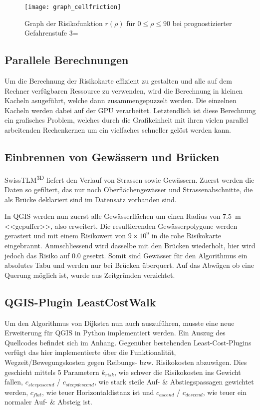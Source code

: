 \begin{figure}[H]
  \centering
  \texttt{[image: graph\_cellfriction]}
  \caption{Graph der Risikofunktion $r(\rho)$ für $0 \leq \rho \leq 90$ bei prognostizierter Gefahrenstufe 3=}\label{fig:graph}
\end{figure}

\subsection{Parallele Berechnungen}

Um die Berechnung der Risikokarte effizient zu gestalten und alle auf dem Rechner verfügbaren Ressource zu verwenden, wird die Berechnung in kleinen Kacheln asugeführt, welche dann zusammengepuzzelt werden. Die einzelnen Kacheln werden dabei auf der GPU verarbeitet. Letztendlich ist diese Berechnung ein grafisches Problem, welches durch die Grafikeinheit mit ihren vielen parallel arbeitenden Rechenkernen um ein vielfaches schneller gelöst werden kann.

\subsection{Einbrennen von Gewässern und Brücken}

SwissTLM\textsuperscript{3D} liefert den Verlauf von Strassen sowie Gewässern. Zuerst werden die Daten so gefiltert, das nur noch Oberflächengewässer und Strassenabschnitte, die als Brücke deklariert sind im Datensatz vorhanden sind.

In QGIS werden nun zuerst alle Gewässerflächen um einen Radius von \qty{7.5}{m} <<gepuffer>>, also erweitert. Die resultierenden Gewässerpolygone werden gerastert und mit einem Risikowert von $9 \times 10^{9}$ in die rohe Risikokarte eingebrannt. Anmschliessend wird dasselbe mit den Brücken wiederholt, hier wird jedoch das Risiko auf $0.0$ gesetzt. Somit sind Gewässer für den Algorithmus ein absolutes Tabu und werden nur bei Brücken überquert. Auf das Abwägen ob eine Querung möglich ist, wurde aus Zeitgründen verzichtet.

\subsection{QGIS-Plugin LeastCostWalk}

Um den Algorithmus von Dijkstra nun auch auszuführen, musste eine neue Erweiterung für QGIS in Python implementiert werden. Ein Auszug des Quellcodes befindet sich im Anhang. Gegenüber bestehenden Least-Cost-Plugins verfügt das hier implementierte über die Funktionalität, Wegzeit/Bewegungskosten gegen Reibungs- bzw. Risikokosten abzuwägen. Dies geschieht mittels 5 Parametern $k_{risk}$, wie schwer die Risikokosten ins Gewicht fallen, $c_{steepascend}$ / $c_{steepdescend}$, wie stark steile Auf- \& Abstiegspassagen gewichtet werden, $c_{flat}$, wie teuer Horizontaldistanz ist und $c_{ascend}$ / $c_{descend}$, wie teuer ein normaler Auf- \& Absteig ist.

